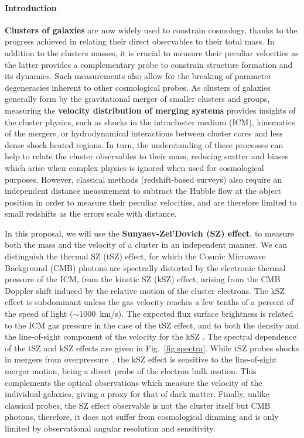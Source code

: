\documentclass[11pt,a4paper,twoside,graphicx,color]{article}
\begin{document}
\paragraph{\large Introduction}
{\bf Clusters of galaxies} are now widely used to constrain cosmology, thanks to the progress achieved in relating their direct observables to their total mass. In addition to the clusters masses, it is crucial to measure their peculiar velocities as the latter provides a complementary probe to constrain structure formation and its dynamics. Such measurements also allow for the breaking of parameter degeneracies inherent to other cosmological probes. As clusters of galaxies generally form by the gravitational merger of smaller clusters and groups, measuring the {\bf velocity distribution of merging systems} provides insights of the cluster physics, such as shocks in the intracluster medium (ICM), kinematics of the mergers, or hydrodynamical interactions between cluster cores and less dense shock heated regions. In turn, the understanding of these processes can help to relate the cluster observables to their mass, reducing scatter and biases which arise when complex physics is ignored when used for cosmological purposes. However, classical methods (redshift-based surveys) also require an independent distance measurement to subtract the Hubble flow at the object position in order to measure their peculiar velocities, and are therefore limited to small redshifts as the errors scale with distance. 

In this proposal, we will use the {\bf Sunyaev-Zel'Dovich (SZ) effect}, to measure both the mass and the velocity of a cluster in an independent manner. We can distinguish the thermal SZ (tSZ) effect, for which the Cosmic Microwave Background (CMB) photons are spectrally distorted by the electronic thermal pressure of the ICM, from the kinetic SZ (kSZ) effect, arising from the CMB Doppler shift induced by the relative motion of the cluster electrons. The kSZ effect is subdominant unless the gas velocity reaches a few tenths of a percent of the speed of light ($\sim$1000~km/s). The expected flux surface brightness is related to the ICM gas pressure in the case of the tSZ effect, and to both the density and the line-of-sight component of the velocity for the kSZ \citep{birkinshaw1999}. The spectral dependence of the tSZ and kSZ effects are given in Fig.~\ref{fig:spectra}. While tSZ probes shocks in mergers from overpressure~\citep[{\it e.g.} \mbox{RX~J1347.5-1145},][]{adam2013}, the kSZ effect is sensitive to the line-of-sight merger motion, being a direct probe of the electron bulk motion. This complements the optical observations which measure the velocity of the individual galaxies, giving a proxy for that of dark matter. Finally, unlike classical probes, the SZ effect observable is not the cluster itself but CMB photons, therefore, it does not suffer from cosmological dimming and is only limited by observational angular resolution and sensitivity.
\end{document}
